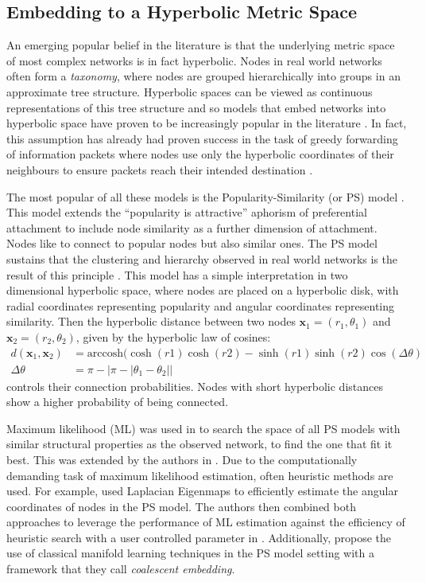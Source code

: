 \documentclass{report}
\begin{document}
	\subsection{Embedding to a Hyperbolic Metric Space}
	
	An emerging popular belief in the literature is that the underlying metric space of most complex networks is in fact hyperbolic. Nodes in real world networks often form a \textit{taxonomy}, where nodes are grouped hierarchically into groups in an approximate tree structure. Hyperbolic spaces can be viewed as continuous representations of this tree structure and so models that embed networks into hyperbolic space have proven to be increasingly popular in the literature \cite{krioukov2009curvature,krioukov2010hyperbolic}. In fact, this assumption has already had proven success in the task of greedy forwarding of information packets where nodes use only the hyperbolic coordinates of their neighbours to ensure packets reach their intended destination \cite{papadopoulos2010greedy}. 
	
	The most popular of all these models is the Popularity-Similarity (or PS) model \cite{papadopoulos2011popularity}. This model extends the ``popularity is attractive'' aphorism of preferential attachment to include node similarity as a further dimension of attachment. Nodes like to connect to popular nodes but also similar ones. The PS model sustains that the clustering and hierarchy observed in real world networks is the result of this principle \cite{alanis2016efficient}. This model has a simple interpretation in two dimensional hyperbolic space, where nodes are placed on a hyperbolic disk, with radial coordinates representing popularity and angular coordinates representing similarity. Then the hyperbolic distance between two nodes $\textbf{x}_1=(r_1, \theta_1)$ and $\textbf{x}_2=(r_2, \theta_2)$, given by  the hyperbolic law of cosines:
	\begin{align}
		d(\textbf{x}_1, \textbf{x}_2) &= \text{arccosh}(\cosh(r1)\cosh(r2) - \sinh(r1)\sinh(r2)\cos(\Delta\theta) \\
		\Delta\theta &= \pi - | \pi - | \theta_1 - \theta_2 | |
	\end{align}
	controls their connection probabilities. Nodes with short hyperbolic distances show a higher probability of being connected.
	
	Maximum likelihood (ML) was used in \cite{papadopoulos2011popularity} to search the space of all PS models with similar structural properties as the observed network, to find the one that fit it best. This was extended by the authors in \cite{papadopoulos2015network,papadopoulos2015networkgeo}. Due to the computationally demanding task of maximum likelihood estimation, often heuristic methods are used. For example, \cite{alanis2016efficient} used Laplacian Eigenmaps to efficiently estimate the angular coordinates of nodes in the PS model. The authors then combined both approaches to leverage the performance of ML estimation against the efficiency of heuristic search with a user controlled parameter in \cite{alanis2016manifold}. Additionally, \cite{thomas2016machine} propose the use of classical manifold learning techniques in the PS model setting with a framework that they call \textit{coalescent embedding}.
	
\end{document}

